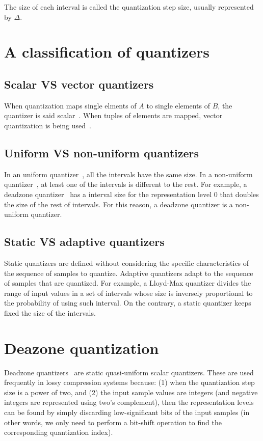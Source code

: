 The size of each interval is called the quantization step size,
usually represented by $\Delta$.

\section{A classification of quantizers}

\subsection{Scalar VS vector quantizers}

When quantization maps single elments of $A$ to single elements of
$B$, the quantizer is said
scalar~\cite{vruiz__scalar_quantization}. When tuples of elements are
mapped, vector quantization is being
used~\cite{vruiz__vector_quantization}.

\subsection{Uniform VS non-uniform quantizers}

In an uniform quantizer~\cite{vruiz__scalar_quantization}, all the
intervals have the same size. In a non-uniform
quantizer~\cite{vruiz__scalar_quantization}, at least one of the
intervals is different to the rest. For example, a deadzone
quantizer~\cite{vruiz__scalar_quantization} has a interval size for
the representation level 0 that doubles the size of the rest of
intervals. For this reason, a deadzone quantizer is a non-uniform
quantizer.

\subsection{Static VS adaptive quantizers}

Static quantizers are defined without considering the specific
characteristics of the sequence of samples to quantize. Adaptive
quantizers adapt to the sequence of samples that are quantized. For
example, a Lloyd-Max quantizer divides the range of input values in a
set of intervals whose size is inversely proportional to the
probability of using such interval. On the contrary, a static
quantizer keeps fixed the size of the intervals.

\section{Deazone quantization}

Deadzone quantizers~\cite{vruiz__scalar_quantization} are static
quasi-uniform scalar quantizers. These are used frequently in lossy
compression systems because: (1) when the quantization step size is a
power of two, and (2) the input sample values are integers (and
negative integers are represented using two's complement), then the
representation levels can be found by simply discarding
low-significant bits of the input samples (in other words, we only
need to perform a bit-shift operation to find the corresponding
quantization index).

